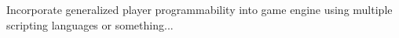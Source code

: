 
\begin{DoxyItemize}
\item Incorporate generalized player programmability into game engine using multiple scripting languages or something... 
\end{DoxyItemize}